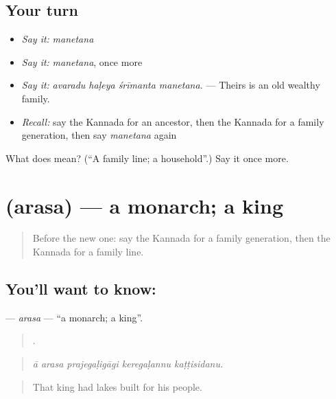 \subsection*{Your turn}
\begin{itemize}
\raggedright
  \item \emph{Say it:} \emph{manetana}
  \item \emph{Say it:} \emph{manetana}, once more
  \item \emph{Say it:} \emph{avaradu haḷeya śrīmanta manetana.} — Theirs is an old wealthy family.
  \item \emph{Recall:} say the Kannada for an ancestor, then the Kannada for a family generation, then say \emph{manetana} again
\end{itemize}

\begin{tcolorbox}[breakable,colback=teal!4,colframe=teal!35!black,title={Before you move on}]
What does  mean? (\textquotedblleft{}A family line; a household\textquotedblright{}.) Say it once more.
\end{tcolorbox}
\section[\texorpdfstring{\kn{ಅರಸ} (arasa)}{ಅರಸ (arasa)}]{ (arasa) — a monarch; a king}

\label{lesson:KA-C341-arasa}



\begin{quote}
Before the new one: say the Kannada for a family generation, then the Kannada for a family line.
\end{quote}

\subsection*{You'll want to know: }
\textbf{} — \emph{arasa} — \textquotedblleft{}a monarch; a king\textquotedblright{}.

\begin{quote}
    .
\end{quote}

\begin{quote}
\emph{ā arasa prajegaḷigāgi keregaḷannu kaṭṭisidanu.}
\end{quote}

\begin{quote}
That king had lakes built for his people.
\end{quote}

